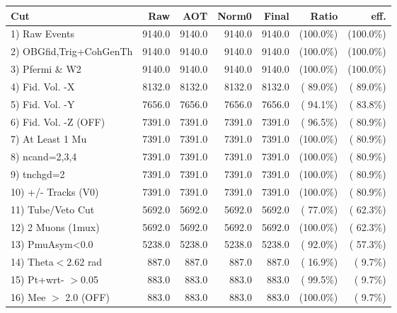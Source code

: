 \begin{table}[h!]\centering
 \begin{tabular}{||l||r|r|r|r|r|r||}
 \hline
 \hline
 Cut & Raw & AOT & Norm0 & Final & Ratio & eff.       \\
 \hline
  1) Raw Events           &       9140.0 &       9140.0 &       9140.0 &       9140.0 & (100.0\%) & (100.0\%) \\
  2) OBGfid,Trig+CohGenTh &       9140.0 &       9140.0 &       9140.0 &       9140.0 & (100.0\%) & (100.0\%) \\
  3) Pfermi \& W2         &       9140.0 &       9140.0 &       9140.0 &       9140.0 & (100.0\%) & (100.0\%) \\
  4) Fid. Vol. -X         &       8132.0 &       8132.0 &       8132.0 &       8132.0 & ( 89.0\%) & ( 89.0\%) \\
  5) Fid. Vol. -Y         &       7656.0 &       7656.0 &       7656.0 &       7656.0 & ( 94.1\%) & ( 83.8\%) \\
  6) Fid. Vol. -Z (OFF)   &       7391.0 &       7391.0 &       7391.0 &       7391.0 & ( 96.5\%) & ( 80.9\%) \\
  7) At Least 1 Mu        &       7391.0 &       7391.0 &       7391.0 &       7391.0 & (100.0\%) & ( 80.9\%) \\
  8) ncand=2,3,4          &       7391.0 &       7391.0 &       7391.0 &       7391.0 & (100.0\%) & ( 80.9\%) \\
  9) tnchgd=2             &       7391.0 &       7391.0 &       7391.0 &       7391.0 & (100.0\%) & ( 80.9\%) \\
 10) +/- Tracks (V0)      &       7391.0 &       7391.0 &       7391.0 &       7391.0 & (100.0\%) & ( 80.9\%) \\
 11) Tube/Veto Cut        &       5692.0 &       5692.0 &       5692.0 &       5692.0 & ( 77.0\%) & ( 62.3\%) \\
 12) 2 Muons (1mux)       &       5692.0 &       5692.0 &       5692.0 &       5692.0 & (100.0\%) & ( 62.3\%) \\
 13) PmuAsym<0.0          &       5238.0 &       5238.0 &       5238.0 &       5238.0 & ( 92.0\%) & ( 57.3\%) \\
 14) Theta$<$2.62 rad     &        887.0 &        887.0 &        887.0 &        887.0 & ( 16.9\%) & (  9.7\%) \\
 15) Pt+wrt- $>$0.05      &        883.0 &        883.0 &        883.0 &        883.0 & ( 99.5\%) & (  9.7\%) \\
 16) Mee $>$ 2.0  (OFF)   &        883.0 &        883.0 &        883.0 &        883.0 & (100.0\%) & (  9.7\%) \\

\end{tabular}
\end{table}

